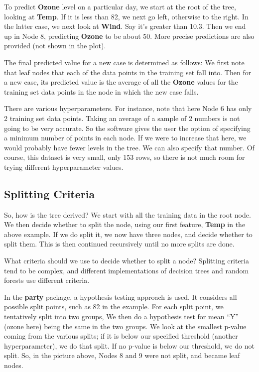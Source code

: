 To predict \textbf{Ozone} level on a particular day, we start at the
root of the tree, looking at \textbf{Temp}.  If it is less than 82, we
next go left, otherwise to the right.  In the latter case, we next look
at \textbf{Wind}.  Say it's greater than 10.3.  Then we end up in Node
8, predicting \textbf{Ozone} to be about 50.  More precise predictions
are also provided (not shown in the plot).

The final predicted value for a new case is determined as follows:  We
first note that leaf nodes that each of the data points in the training set
fall into.  Then for a new case, its predicted value is the average of
all the \textbf{Ozone} values for the training set data points in the
node in which the new case falls.

There are various hyperparameters.  For instance, note that here Node 6
has only 2 training set data points.  Taking an average of a sample of 2
numbers is not going to be very accurate.  So the software gives the
user the option of specifying a minimum number of points in each node.
If we were to increase that here, we would probably have fewer levels in
the tree.  We can also specify that number.  Of course, this dataset is
very small, only 153 rows, so there is not much room for trying
different hyperparameter values.

\subsection{Splitting Criteria}

So, how is the tree derived?  We start with all the training data in the
root node.  We then decide whether to split the node, using our first
feature, \textbf{Temp} in the above example.  If we do split it, we now
have three nodes, and decide whether to split them.  This is then
continued recursively until no more splits are done.

What criteria should we use to decide whether to split a node?
Splitting criteria tend to be complex, and different implementations of
decision trees and random forests use different criteria.

In the \textbf{party} package, a hypothesis testing approach is used.
It considers all possible split points, such as 82 in the example.  For
each split point, we tentatively split into two groups,  We then do a
hypothesis test for mean ``Y'' (ozone here) being the same in the two
groups.  We look at the smallest p-value coming from the various splits;
if it is below our specified threshold (another hyperparameter), we do
that split.  If no p-value is below our threshold, we do not split.
So, in the picture above, Nodes 8 and 9 were not split, and became leaf
nodes.

